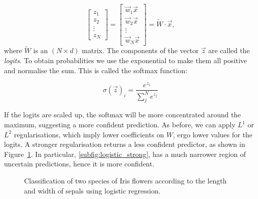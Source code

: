 \begin{equation*}
\begin{bmatrix}z_1 \\ z_2 \\ \vdots \\ z_N\end{bmatrix} = 
\begin{bmatrix}
\vec w_1 \vec{x} \\ \vec w_2 \vec{x} \\ \vdots \\ \vec w_N \vec{x}
\end{bmatrix} = 
\widetilde W \cdot \vec{x},
\end{equation*}
where $\widetilde W$ is an $(N \times d)$ matrix.
The components of the vector $\vec{z}$ are called the \emph{logits}. 
To obtain probabilities we use the exponential to make them all positive and normalise the sum.
This is called the softmax function:

\begin{equation*}
\sigma(\vec{z})_i = \frac{e^{z_i}}{\sum_j^N e^{z_j}}
\end{equation*}

If the logits are scaled up, the softmax will be more concentrated around the maximum, suggesting a more confident prediction.
As before, we can apply $L^1$ or $L^2$ regularisations, which imply lower coefficients on $W$, ergo lower values for the logits.
A stronger regularisation returns a less confident predictor, as shown in Figure~\ref{fig:logistic}.
In particular, \ref{subfig:logistic_strong}, has a much narrower region of uncertain predictions, hence it is more confident. 

\begin{figure}
	\centering
	\hfil
	\caption{Classification of two species of Iris flowers according to the length and width of sepals using logistic regression.}\label{fig:logistic}
\end{figure}


